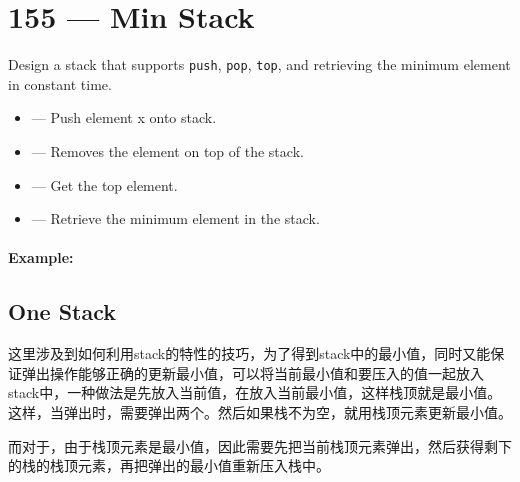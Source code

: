 \section{155 --- Min Stack}
Design a stack that supports \texttt{push}, \texttt{pop}, \texttt{top}, and retrieving the minimum element in constant time.
\begin{itemize}
\item {} --- Push element x onto stack.
\item {} --- Removes the element on top of the stack.
\item {} --- Get the top element.
\item {} --- Retrieve the minimum element in the stack.
\end{itemize}
\paragraph{Example:}
\begin{flushleft}









\end{flushleft}

\subsection{One Stack}

这里涉及到如何利用stack的特性的技巧，为了得到stack中的最小值，同时又能保证弹出操作能够正确的更新最小值，可以将当前最小值和要压入的值一起放入stack中，一种做法是先放入当前值，在放入当前最小值，这样栈顶就是最小值。这样，当弹出时，需要弹出两个。然后如果栈不为空，就用栈顶元素更新最小值。

而对于，由于栈顶元素是最小值，因此需要先把当前栈顶元素弹出，然后获得剩下的栈的栈顶元素，再把弹出的最小值重新压入栈中。

